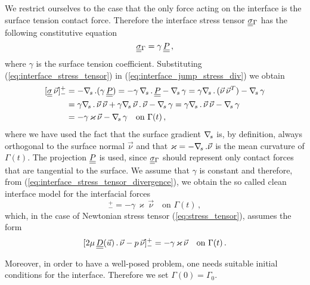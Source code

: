 We restrict ourselves to the case that the only force acting on the interface
is the surface tension contact force. Therefore the interface stress tensor
$\mat\sigma_\Gamma$ has the following constitutive equation
\begin{equation}\label{eq:interface_stress_tensor}
\mat\sigma_{\Gamma}=\gamma\,\mat P\,,
\end{equation}
where $\gamma$ is the surface tension coefficient. Substituting
(\ref{eq:interface_stress_tensor}) in (\ref{eq:interface_jump_stress_div}) we
obtain
\begin{align}\label{eq:interface_stress_tensor_divergence}
[\mat\sigma\,\vec \nu]_-^+ &= -\nabs\,.(\gamma\,\mat P)
= -\gamma\,\nabs\,.\,\mat P-\nabs\,\gamma
= \gamma\nabs\,.\,(\vec\nu\,\vec\nu^T)-\nabs\,\gamma \nonumber \\
& = \gamma\nabs\,.\,\vec\nu\,\vec\nu + \gamma\nabs\,\vec\nu\,.\,\vec\nu
- \nabs\,\gamma = \gamma\nabs\,.\,\vec\nu\,\vec\nu - \nabs\,\gamma \nonumber \\
& = -\gamma\,\varkappa\,\vec\nu - \nabs\,\gamma \quad \mbox{on } \Gamma(t)\,,
\end{align}
where we have used the fact that the surface gradient $\nabla_{\!s}$ is, by definition,
always orthogonal to the surface normal $\vec\nu$ and that $\varkappa =
-\nabla_{\!s}\,.\vec\nu$ is the mean curvature of $\Gamma(t)$. The projection $\mat P$
is used, since $\mat\sigma_{\Gamma}$ should represent only contact forces that
are tangential to the surface. We assume that $\gamma$ is constant and
therefore, from (\ref{eq:interface_stress_tensor_divergence}), we obtain the
so called clean interface model for the interfacial forces
\begin{equation}
[\mat\sigma\,\vec \nu]_-^+ = -\gamma\,\varkappa\,\vec\nu \quad \mbox{on }
\Gamma(t)\,,
\end{equation}
which, in the case of Newtonian stress tensor (\ref{eq:stress_tensor}), assumes
the form
\begin{equation}\label{eq:interface_jump_stress}
[2\mu \,\mat D(\vec u)\,.\,\vec\nu - p\,\vec \nu]_-^+
= -\gamma\,\varkappa\,\vec\nu \quad \mbox{on } \Gamma(t)\,.
\end{equation}

Moreover, in order to have a well-posed problem, one needs suitable initial
conditions for the interface. Therefore we set $\Gamma(0)=\Gamma_0$.

